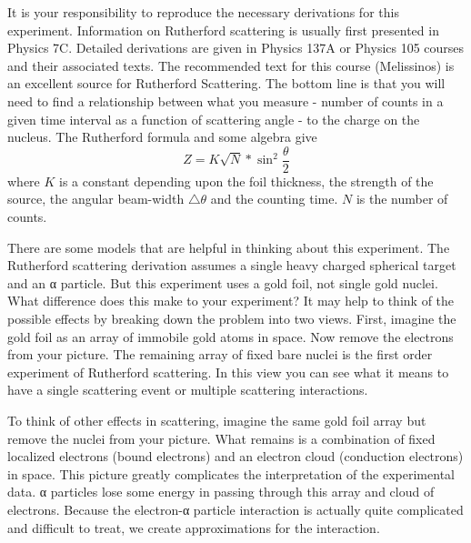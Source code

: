 \documentclass{../lab}
\begin{document}
It is your responsibility to reproduce the necessary derivations for this experiment. Information on Rutherford scattering is usually first presented in Physics 7C. Detailed derivations are given in Physics 137A or Physics 105 courses and their associated texts. The recommended text for this course (Melissinos) is an excellent source for Rutherford Scattering. The bottom line is that you will need to find a relationship between what you measure - number of counts in a given time interval as a function of scattering angle - to the charge on the nucleus. The Rutherford formula and some algebra give
\[Z = K \sqrt{N} * \sin^2 \frac{\theta}{2}\]
where $K$ is a constant depending upon the foil thickness, the strength of the source, the angular beam-width $\triangle \theta$ and the counting time. $N$ is the number of counts.

There are some models that are helpful in thinking about this experiment. The Rutherford scattering derivation assumes a single heavy charged spherical target and an α particle. But this experiment uses a gold foil, not single gold nuclei. What difference does this make to your experiment? It may help to think of the possible effects by breaking down the problem into two views. First, imagine the gold foil as an array of immobile gold atoms in space. Now remove the electrons from your picture. The remaining array of fixed bare nuclei is the first order experiment of Rutherford scattering. In this view you can see what it means to have a single scattering event or multiple scattering interactions.

To think of other effects in scattering, imagine the same gold foil array but remove the nuclei from your picture. What remains is a combination of fixed localized electrons (bound electrons) and an electron cloud (conduction electrons) in space. This picture greatly complicates the interpretation of the experimental data. α particles lose some energy in passing through this array and cloud of electrons. Because the electron-α particle interaction is actually quite complicated and difficult to treat, we create approximations for the interaction.
\end{document}
